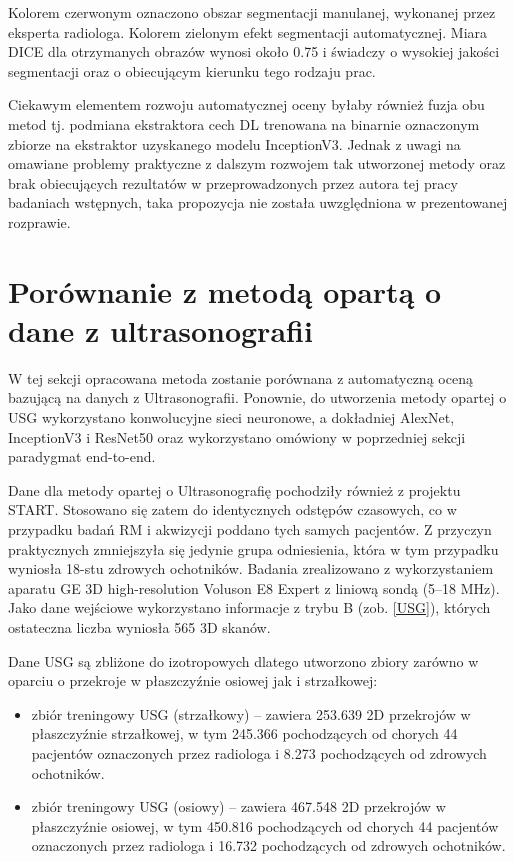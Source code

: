 Kolorem czerwonym oznaczono obszar segmentacji manulanej, wykonanej przez eksperta radiologa. Kolorem zielonym efekt segmentacji automatycznej. Miara DICE dla otrzymanych obrazów wynosi około 0.75 i świadczy o wysokiej jakości segmentacji oraz o obiecującym kierunku tego rodzaju prac.

Ciekawym elementem rozwoju automatycznej oceny byłaby również fuzja obu metod tj. podmiana ekstraktora cech DL trenowana na binarnie oznaczonym zbiorze na ekstraktor uzyskanego modelu InceptionV3. Jednak z uwagi na omawiane problemy praktyczne z dalszym rozwojem tak utworzonej metody oraz brak obiecujących rezultatów w przeprowadzonych przez autora tej pracy badaniach wstępnych, taka propozycja nie została uwzględniona w prezentowanej rozprawie. 

\section{Porównanie z metodą opartą o dane z ultrasonografii}

W tej sekcji opracowana metoda zostanie porównana z automatyczną oceną bazującą na danych z Ultrasonografii. Ponownie, do utworzenia metody opartej o USG wykorzystano konwolucyjne sieci neuronowe, a dokładniej AlexNet, InceptionV3 i ResNet50 oraz wykorzystano omówiony w poprzedniej sekcji paradygmat end-to-end. 

Dane dla metody opartej o Ultrasonografię pochodziły również z projektu START. Stosowano się zatem do identycznych odstępów czasowych, co w przypadku badań RM i akwizycji poddano tych samych pacjentów. Z przyczyn praktycznych zmniejszyła się jedynie grupa odniesienia, która w tym przypadku wyniosła 18-stu zdrowych ochotników. Badania zrealizowano z wykorzystaniem aparatu GE 3D high-resolution Voluson E8 Expert z liniową sondą (5--18 MHz). Jako dane wejściowe wykorzystano informacje z trybu B (zob. \ref{USG}), których ostateczna liczba wyniosła 565 3D skanów. 

Dane USG są zbliżone do izotropowych dlatego utworzono zbiory zarówno w oparciu o przekroje w płaszczyźnie osiowej jak i strzałkowej:
\begin{itemize}
	\item zbiór treningowy USG (strzałkowy) -- zawiera 253.639 2D przekrojów w płaszczyźnie strzałkowej, w tym 245.366 pochodzących od chorych 44 pacjentów oznaczonych przez radiologa i 8.273 pochodzących od zdrowych ochotników.
	\item zbiór treningowy USG (osiowy) -- zawiera 467.548 2D przekrojów w płaszczyźnie osiowej, w tym 450.816 pochodzących od chorych 44 pacjentów oznaczonych przez radiologa i 16.732 pochodzących od zdrowych ochotników. 
\end{itemize}

